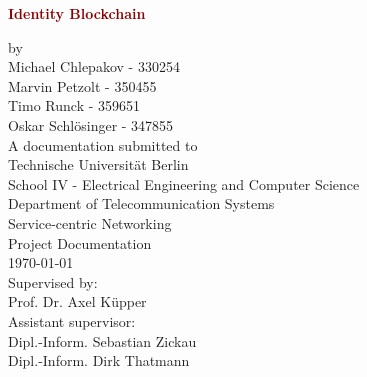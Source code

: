 \begin{titlepage}
	\strut
	\hfill
	\begin{center}
	\vspace{1cm}
		\Huge
		\begin{spacing}{.9}
			\textcolor{DarkRed}{\textbf{Identity Blockchain}}\\
		\end{spacing}
		\vspace{0.8cm}
		\large
		by\\
		\vspace{0.8cm}
		Michael Chlepakov - 330254 \\
		Marvin Petzolt - 350455 \\
		Timo Runck - 359651 \\
		Oskar Schl{\"o}singer - 347855 \\
		\vspace{2cm}
	 	A documentation submitted to\\
		\vspace{0.5cm}
		Technische Universität Berlin\\
		School IV - Electrical Engineering and Computer Science\\
		Department of Telecommunication Systems\\
		Service-centric Networking\\
		\vspace{0.5cm}
		Project Documentation\\
		\vspace{2.2cm}
		\today\\
		\vspace{2.0cm}
		\large
		Supervised by:\\
		Prof. Dr. Axel Küpper\\
		\vspace{1cm}
		Assistant supervisor:\\
		Dipl.-Inform. Sebastian Zickau \\
		Dipl.-Inform. Dirk Thatmann
		\end{center}
\end{titlepage}

